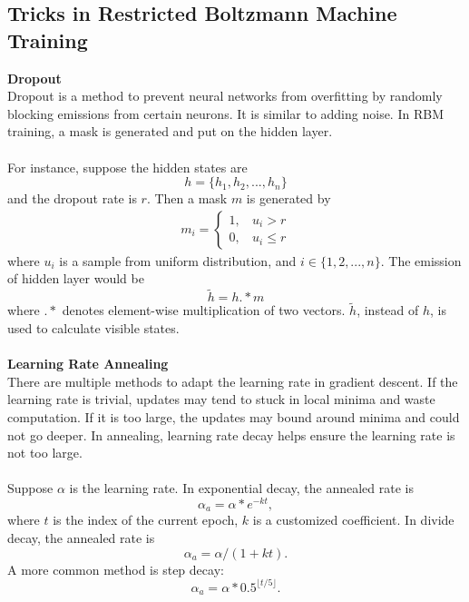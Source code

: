 \documentclass[12pt]{article}
\begin{document}
\subsection{Tricks in Restricted Boltzmann Machine Training}
\textbf{Dropout}\\
Dropout is a method to prevent neural networks from overfitting by randomly blocking emissions from certain neurons. It is similar to adding noise. In RBM training, a mask is generated and put on the hidden layer.\\
\\
For instance, suppose the hidden states are \begin{equation}
h = \{h_1, h_2, ..., h_n\}
\end{equation}
and the dropout rate is $r$. Then a mask $m$ is generated by 
\begin{eqnarray}
m_i=\begin{cases}
1,~~~~u_i > r\\
0,~~~~u_i \leq r
\end{cases}
\end{eqnarray}
where $u_i$ is a sample from uniform distribution, and $i\in \{1, 2, ..., n\}$. The emission of hidden layer would be \begin{equation}
\tilde{h} = h.* m
\end{equation}
where $.*$ denotes element-wise multiplication of two vectors. $\tilde{h}$, instead of $h$, is used to calculate visible states.\\
\\
\textbf{Learning Rate Annealing}\\
There are multiple methods to adapt the learning rate in gradient descent. If the learning rate is trivial, updates may tend to stuck in local minima and waste computation. If it is too large, the updates may bound around minima and could not go deeper. In annealing, learning rate decay helps ensure the learning rate is not too large.\\
\\
Suppose $\alpha$ is the learning rate. In exponential decay, the annealed rate is\begin{equation}
\alpha_a = \alpha * e^{-kt},
\end{equation}
where $t$ is the index of the current epoch, $k$ is a customized coefficient. In divide decay, the annealed rate is\begin{equation}
\alpha_a = \alpha / (1 + kt).
\end{equation}
A more common method is step decay:\begin{equation}
\alpha_a = \alpha * 0.5^{\lfloor{t / 5}\rfloor{}}.
\end{equation}
\end{document}
